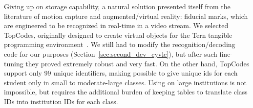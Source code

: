 Giving up on storage capability, a natural solution presented itself from the literature of motion capture and augmented/virtual reality: fiducial marks, which are engineered to be recognized in real-time in a video stream. We selected TopCodes\cite{horn2012topcode}, originally designed to create virtual objects for the Tern tangible programming environment~\cite{horn2007designing}. We still had to modify the recognition/decoding code for our purposes (Section~\ref{sec:second_dev_cyvle}), but after such fine-tuning they proved extremely robust and very fast. On the other hand, TopCodes support only 99 unique identifiers, making possible to give unique ids for each student only in small to moderate-large classes. Using on large institutions is not impossible, but requires the additional burden of keeping tables to translate class IDs into institution IDs for each class.





